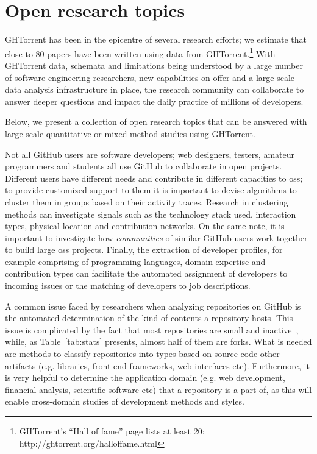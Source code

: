 \documentclass{sig-alternate}
\begin{document}
\section{Open research topics}

GHTorrent has been in the epicentre of several research
efforts; we estimate that close to 80 papers have been written using data from
GHTorrent.\footnote{GHTorrent's ``Hall of fame'' page lists at least 20:
http://ghtorrent.org/halloffame.html} With GHTorrent data, schemata and
limitations being understood by a large number of software engineering
researchers, new capabilities on offer and a large scale data analysis
infrastructure in place, the research community can collaborate to answer deeper
questions and impact the daily practice of millions of developers.

Below, we present a collection of open research topics that can be answered
with large-scale quantitative or mixed-method studies using GHTorrent.

 Not all GitHub users are software developers;
web designers, testers, amateur programmers and students all use GitHub to
collaborate in open projects. Different users have different needs and
contribute in different capacities to {\sc oss}; to provide customized support
to them it is important to devise algorithms to cluster them in groups based on
their activity traces. Research in clustering methods can investigate signals
such as the technology stack used, interaction types, physical location and
contribution networks. On the same note, it is important to investigate how
\emph{communities} of similar GitHub users work together to build large {\sc
oss} projects. Finally, the extraction of developer profiles, for example
comprising of programming languages, domain expertise and contribution types can
facilitate the automated assignment of developers to incoming issues or the
matching of developers to job descriptions.

 A common issue faced by researchers when analyzing
repositories on GitHub is the automated determination of the kind of contents a
repository hosts. This issue is complicated by the fact that most repositories
are small and inactive~\cite{KGBSGD15}, while, as Table~\ref{tab:stats}
presents, almost half of them are forks. What is needed are methods to classify
repositories into types based on source code other artifacts (e.g. libraries,
front end frameworks, web interfaces etc).  Furthermore, it is very helpful to
determine the application domain (e.g. web development, financial analysis,
scientific software etc) that a repository is a part of, as this will enable
cross-domain studies of development methods and styles.
\end{document}
